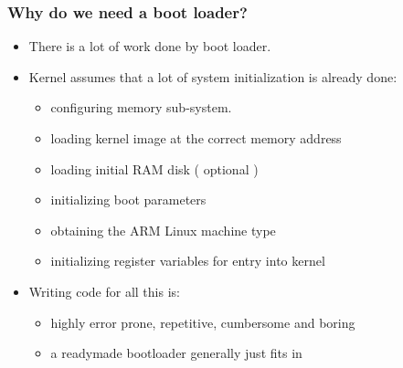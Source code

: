 \documentclass[11pt]{beamer}
\begin{document}
\begin{frame}[fragile]\frametitle{Why do we need a boot loader?}
\label{sec-3.2}

\begin{itemize}

\item There is a lot of work done by boot loader.\\
\label{sec-3.2.1}


\item Kernel assumes that a lot of system initialization is already done:\\
\label{sec-3.2.2}

\begin{itemize}

\item configuring memory sub-system.\\
\label{sec-3.2.2.1}


\item loading kernel image at the correct memory address\\
\label{sec-3.2.2.2}


\item loading initial RAM disk ( optional )\\
\label{sec-3.2.2.3}


\item initializing boot parameters\\
\label{sec-3.2.2.4}


\item obtaining the ARM Linux machine type\\
\label{sec-3.2.2.5}


\item initializing register variables for entry into kernel\\
\label{sec-3.2.2.6}

\end{itemize} %

\item Writing code for all this is:\\
\label{sec-3.2.3}

\begin{itemize}

\item highly error prone, repetitive, cumbersome and boring\\
\label{sec-3.2.3.1}


\item a readymade bootloader generally just fits in\\
\label{sec-3.2.3.2}


\end{itemize} %
\end{itemize} %
\end{frame}
\end{document}
